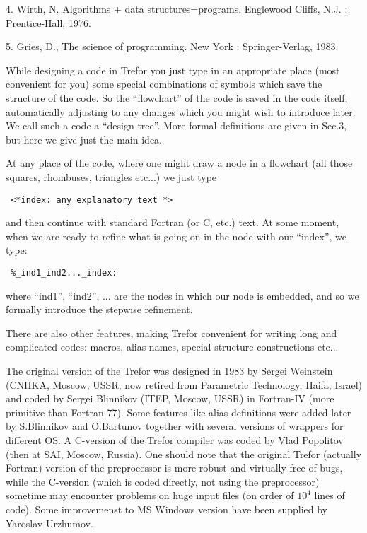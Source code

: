 \item{4.} Wirth, N.
      Algorithms + data structures=programs.  Englewood Cliffs,
    N.J. : Prentice-Hall, 1976.

\item{5.} Gries, D.,
      The science of programming.  New York : Springer-Verlag,
    1983.


While designing a code in Trefor you just type in an appropriate
place (most convenient for you) some special combinations of symbols
which save the structure of the code. So the ``flowchart'' of the
code is saved in the code itself, automatically adjusting to any
changes which you might wish to introduce later.
We call such a code a ``design tree''.
More formal definitions are given in Sec.3, but here we give just the
main idea.

At any place of the code, where one might draw a node in a flowchart
(all those squares, rhombuses, triangles etc...) we just type

{\tt
\qquad <*index: any explanatory text *>  }

\par\noindent and then continue with standard Fortran (or C, etc.) text.
At some moment,
when we are ready to refine  what is going on
in the node with our ``index'', we type:

{\tt
\qquad \%\_ind1\_ind2...\_index: }

\par\noindent where ``ind1'', ``ind2'', ... are the nodes in which
our node is embedded,
and so we formally introduce the stepwise refinement.

   There are also other features, making Trefor convenient for writing long
and complicated codes: macros, alias names, special structure
constructions etc...

The original version of the Trefor was designed in 1983 by Sergei Weinstein
(CNIIKA, Moscow, USSR, now retired from Parametric Technology, Haifa, Israel)
and coded by Sergei Blinnikov (ITEP, Moscow, USSR)
in Fortran-IV (more primitive than Fortran-77). Some features like alias definitions
were added later by S.Blinnikov and O.Bartunov together with several versions
of wrappers for different OS. A C-version of the Trefor compiler was
coded by Vlad Popolitov (then at SAI, Moscow, Russia).
One should note that the original Trefor (actually Fortran) version of the preprocessor
is more robust and virtually free of bugs, while the C-version (which is coded
directly, not using the preprocessor) sometime may encounter problems on huge
input files (on order of $10^4$ lines of code). Some improvemenst to MS Windows
version have been supplied by Yaroslav Urzhumov.


